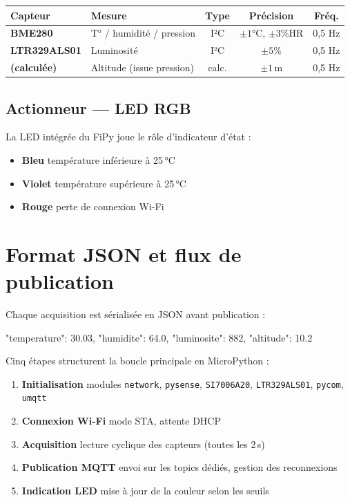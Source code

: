 \documentclass[11pt,a4paper]{article}
\begin{document}
\begin{tabularx}{\linewidth}{@{}>{\bfseries}l l c c c@{}}
\toprule
\rowcolor{light} Capteur & Mesure & Type & Précision & Fréq. \\ \midrule
BME280       & T° / humidité / pression  & I²C    & $\pm 1$°C, $\pm 3$\%HR & 0,5 Hz \\
LTR329ALS01  & Luminosité                & I²C    & $\pm 5$\%               & 0,5 Hz \\
(calculée)   & Altitude (issue pression) & calc.  & $\pm 1$\,m              & 0,5 Hz \\
\bottomrule
\end{tabularx}

\subsection{Actionneur — LED RGB}
La LED intégrée du FiPy joue le rôle d'indicateur d'état :
\begin{itemize}
  \item \textcolor{blue!70!black}{\faCircle} \textbf{Bleu} \textemdash{} température inférieure à 25\,°C
  \item \textcolor{violet}{\faCircle} \textbf{Violet} \textemdash{} température supérieure à 25\,°C
  \item \textcolor{red}{\faCircle} \textbf{Rouge} \textemdash{} perte de connexion Wi-Fi
\end{itemize}

\section{Format JSON et flux de publication}

Chaque acquisition est sérialisée en JSON avant publication :

\begin{codebox}[listing options={style=pystyle,language=Java}]
{
  "temperature": 30.03,
  "humidite":    64.0,
  "luminosite":  882,
  "altitude":    10.2
}
\end{codebox}

Cinq étapes structurent la boucle principale en MicroPython :

\begin{enumerate}
  \item \textbf{Initialisation} \textemdash{} modules \texttt{network}, \texttt{pysense}, \texttt{SI7006A20}, \texttt{LTR329ALS01}, \texttt{pycom}, \texttt{umqtt}
  \item \textbf{Connexion Wi-Fi} \textemdash{} mode STA, attente DHCP
  \item \textbf{Acquisition} \textemdash{} lecture cyclique des capteurs (toutes les 2\,s)
  \item \textbf{Publication MQTT} \textemdash{} envoi sur les topics dédiés, gestion des reconnexions
  \item \textbf{Indication LED} \textemdash{} mise à jour de la couleur selon les seuils
\end{enumerate}
\end{document}
